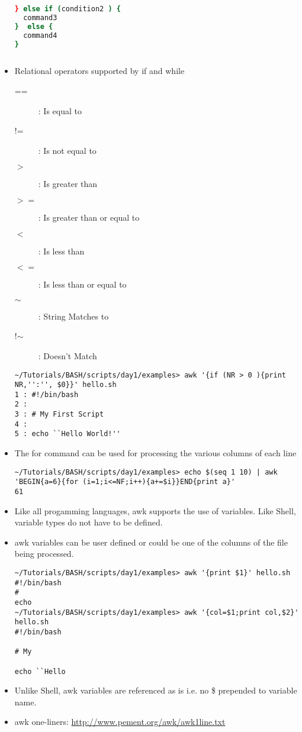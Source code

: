 \documentclass[10pt,t]{beamer}
\begin{document}
\begin{frame}
\begin{itemize}
\begin{columns}
\begin{exampleblock}{}
\begin{lstlisting}[language=bash]
} else if (condition2 ) {
  command3
}  else {
  command4
}
        \end{lstlisting}
      \end{exampleblock}
    \end{columns}
    \item Relational operators supported by if and while
    \begin{description}
        \item[==]: Is equal to
        \item[!=]: Is not equal to
        \item[$>$]: Is greater than
        \item[$>=$]: Is greater than or equal to
        \item[$<$]: Is less than
        \item[$<=$]: Is less than or equal to
        \item[$\sim$]: String Matches to
        \item[!$\sim$]: Doesn't Match
    \end{description}
    \begin{lstlisting}[style=LINUX]
~/Tutorials/BASH/scripts/day1/examples> awk '{if (NR > 0 ){print NR,'':'', $0}}' hello.sh 
1 : #!/bin/bash
2 : 
3 : # My First Script
4 : 
5 : echo ``Hello World!''
    \end{lstlisting}
    \item The for command can be used for processing the various columns of each line
    \begin{lstlisting}[style=LINUX]
~/Tutorials/BASH/scripts/day1/examples> echo $(seq 1 10) | awk 'BEGIN{a=6}{for (i=1;i<=NF;i++){a+=$i}}END{print a}'                                                                                 
61
    \end{lstlisting}
    \item Like all progamming languages, awk supports the use of variables. Like Shell, variable types do not have to be defined.
    \item awk variables can be user defined or could be one of the columns of the file being processed.
    \begin{lstlisting}[style=LINUX]
~/Tutorials/BASH/scripts/day1/examples> awk '{print $1}' hello.sh 
#!/bin/bash
#
echo
~/Tutorials/BASH/scripts/day1/examples> awk '{col=$1;print col,$2}' hello.sh 
#!/bin/bash 
 
# My
 
echo ``Hello
    \end{lstlisting}
    \item Unlike Shell, awk variables are referenced as is i.e. no \$ prepended to variable name.
    \item awk one-liners: \url{http://www.pement.org/awk/awk1line.txt}

  \end{itemize}
\end{frame}
\end{document}
